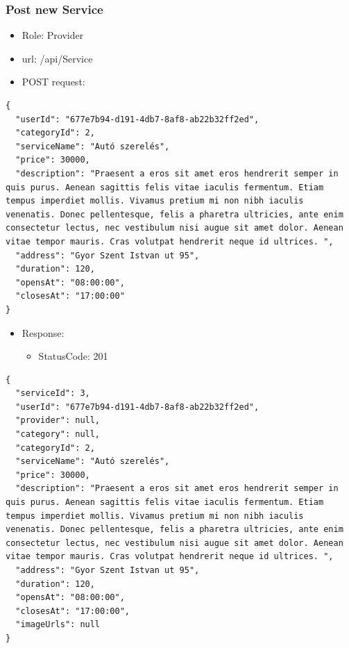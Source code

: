 \documentclass[11pt]{article}
\begin{document}
\subsubsection{Post new Service}
\label{sec:org8bc4306}
\begin{itemize}
\item Role: Provider
\item url: /api/Service
\item POST request:
\end{itemize}
\begin{verbatim}
{
  "userId": "677e7b94-d191-4db7-8af8-ab22b32ff2ed",
  "categoryId": 2,
  "serviceName": "Autó szerelés",
  "price": 30000,
  "description": "Praesent a eros sit amet eros hendrerit semper in quis purus. Aenean sagittis felis vitae iaculis fermentum. Etiam tempus imperdiet mollis. Vivamus pretium mi non nibh iaculis venenatis. Donec pellentesque, felis a pharetra ultricies, ante enim consectetur lectus, nec vestibulum nisi augue sit amet dolor. Aenean vitae tempor mauris. Cras volutpat hendrerit neque id ultrices. ",
  "address": "Gyor Szent Istvan ut 95",
  "duration": 120,
  "opensAt": "08:00:00",
  "closesAt": "17:00:00"
}
\end{verbatim}
\begin{itemize}
\item Response:
\begin{itemize}
\item StatusCode: 201
\end{itemize}
\end{itemize}
\begin{verbatim}
{
  "serviceId": 3,
  "userId": "677e7b94-d191-4db7-8af8-ab22b32ff2ed",
  "provider": null,
  "category": null,
  "categoryId": 2,
  "serviceName": "Autó szerelés",
  "price": 30000,
  "description": "Praesent a eros sit amet eros hendrerit semper in quis purus. Aenean sagittis felis vitae iaculis fermentum. Etiam tempus imperdiet mollis. Vivamus pretium mi non nibh iaculis venenatis. Donec pellentesque, felis a pharetra ultricies, ante enim consectetur lectus, nec vestibulum nisi augue sit amet dolor. Aenean vitae tempor mauris. Cras volutpat hendrerit neque id ultrices. ",
  "address": "Gyor Szent Istvan ut 95",
  "duration": 120,
  "opensAt": "08:00:00",
  "closesAt": "17:00:00",
  "imageUrls": null
}
\end{verbatim}
\end{document}
